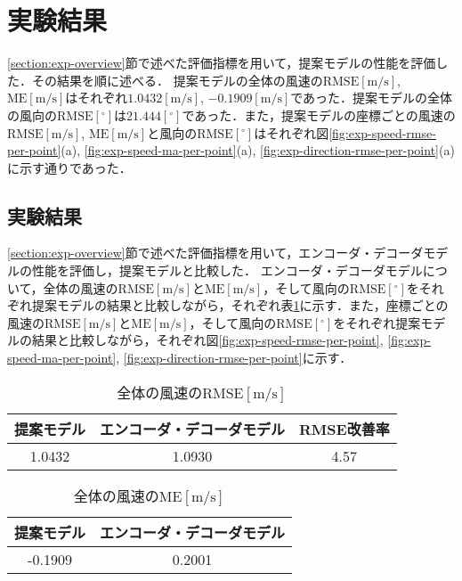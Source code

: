 \section{実験結果 \label{section:exp-results}}
\ref{section:exp-overview}節で述べた評価指標を用いて，提案モデルの性能を評価した．その結果を順に述べる．
提案モデルの全体の風速の$\mathrm{RMSE[m/s]}$, $\mathrm{ME[m/s]}$はそれぞれ$1.0432\mathrm{[m/s]}$, $-0.1909\mathrm{[m/s]}$であった．提案モデルの全体の風向の$\mathrm{RMSE[^\circ]}$は$21.444\mathrm{[^\circ]}$であった．また，提案モデルの座標ごとの風速の$\mathrm{RMSE[m/s]}$, $\mathrm{ME[m/s]}$と風向の$\mathrm{RMSE[^\circ]}$はそれぞれ図\ref{fig:exp-speed-rmse-per-point}(a), \ref{fig:exp-speed-ma-per-point}(a), \ref{fig:exp-direction-rmse-per-point}(a)に示す通りであった．


\subsection{実験結果 \label{subsection:exp-results-without-physicial-structure}}
\ref{section:exp-overview}節で述べた評価指標を用いて，エンコーダ・デコーダモデルの性能を評価し，提案モデルと比較した．
エンコーダ・デコーダモデルについて，全体の風速の$\mathrm{RMSE[m/s]}$と$\mathrm{ME[m/s]}$，そして風向の$\mathrm{RMSE[^\circ]}$をそれぞれ提案モデルの結果と比較しながら，それぞれ表\ref{table:exp-total-rmse}に示す．また，座標ごとの風速の$\mathrm{RMSE[m/s]}$と$\mathrm{ME[m/s]}$，そして風向の$\mathrm{RMSE[^\circ]}$をそれぞれ提案モデルの結果と比較しながら，それぞれ図\ref{fig:exp-speed-rmse-per-point}, \ref{fig:exp-speed-ma-per-point}, \ref{fig:exp-direction-rmse-per-point}に示す．

\begin{table}[bp]
  \caption{全体の風速の$\mathrm{RMSE[m/s]}$}
  \label{table:exp-total-rmse}
  \centering
  \begin{tabular}{ccc}
    \hline
    提案モデル & エンコーダ・デコーダモデル & RMSE改善率 \\
    \hline
    1.0432 & 1.0930 & 4.57 \\
    \hline
  \end{tabular}
\end{table}

\begin{table}[bp]
  \caption{全体の風速の$\mathrm{ME[m/s]}$}
  \label{table:exp-total-me}
  \centering
  \begin{tabular}{cc}
    \hline
    提案モデル & エンコーダ・デコーダモデル \\
    \hline
    -0.1909 & 0.2001 \\
    \hline
  \end{tabular}
\end{table}

